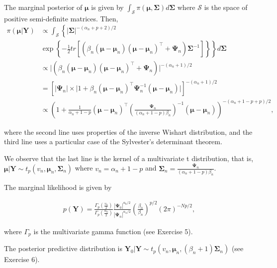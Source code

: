 \begin{enumerate}
The marginal posterior of $\bm{\mu}$ is given by $\int_{\mathcal{S}} \pi(\bm{\mu},\bm{\Sigma})d\bm{\Sigma}$ where $\mathcal{S}$ is the space of positive semi-definite matrices. Then,
{\footnotesize{
\begin{align}
	\pi(\bm{\mu}|\mathbf{Y})&\propto\int_{\mathcal{S}}\left\{|\bm{\Sigma}|^{-(\alpha_n+p+2)/2}\right.\nonumber\\
	&\left. \exp\left\{-\frac{1}{2}tr\left[\left(\beta_n\left(\bm{\mu}-\bm{\mu}_n\right)\left(\bm{\mu}-\bm{\mu}_n\right)^{\top}+\mathbf{\Psi}_n\right)\bm{\Sigma}^{-1}\right]\right\} \right\}d\bm{\Sigma}\nonumber\\
	&\propto \big\lvert\left(\beta_n\left(\bm{\mu}-\bm{\mu}_n\right)\left(\bm{\mu}-\bm{\mu}_n\right)^{\top}+\mathbf{\Psi}_n\right)\big\lvert^{-(\alpha_n+1)/2}\nonumber\\
	&=\left[\big\lvert\mathbf{\Psi}_n\big\lvert\times \big\lvert1+\beta_n\left(\bm{\mu}-\bm{\mu}_n\right)^{\top}\mathbf{\Psi}_n^{-1}\left(\bm{\mu}-\bm{\mu}_n\right)\big\lvert\right]^{-(\alpha_n+1)/2}\nonumber\\
	&\propto \left(1+\frac{1}{\alpha_n+1-p}\left(\bm{\mu}-\bm{\mu}_n\right)^{\top}\left(\frac{\mathbf{\Psi}_n}{(\alpha_n+1-p)\beta_n}\right)^{-1}\left(\bm{\mu}-\bm{\mu}_n\right)\right)^{-(\alpha_n+1-p+p)/2},\nonumber 
\end{align}
}}

where the second line uses properties of the inverse Wishart distribution, and the third line uses a particular case of the Sylvester's determinant theorem.

We observe that the last line is the kernel of a multivariate t distribution, that is, $\bm{\mu}|\mathbf{Y}\sim t_p(v_n,\bm{\mu}_n,\bm{\Sigma}_n)$ where $v_n=\alpha_n+1-p$ and $\bm{\Sigma}_n=\frac{\mathbf{\Psi}_n}{(\alpha_n+1-p)\beta_n}$.

The marginal likelihood is given by

\begin{align}
	p(\mathbf{Y})=\frac{\Gamma_p\left(\frac{v_n}{2}\right)}{\Gamma_p\left(\frac{\alpha_0}{2}\right)}\frac{|\mathbf{\Psi}_0|^{\alpha_0/2}}{|\mathbf{\Psi}_n|^{\alpha_n/2}}\left(\frac{\beta_0}{\beta_n}\right)^{p/2}(2\pi)^{-Np/2},\nonumber
\end{align}

where $\Gamma_p$ is the multivariate gamma function (see Exercise 5).

The posterior predictive distribution is $\mathbf{Y}_0|\mathbf{Y}\sim t_p(v_n,\bm{\mu}_n,(\beta_n+1)\bm{\Sigma}_n)$ (see Exercise 6).


\end{enumerate}
